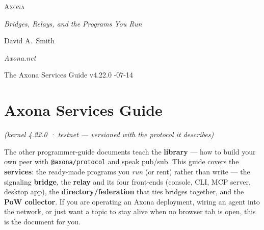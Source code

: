\documentclass[
  nobib]{tufte-handout}
\author{}
\date{}
\begin{document}
\thispagestyle{empty}
\null\vfill
\begin{center}
{\fontsize{48}{52}\selectfont \textsc{Axona}\par}
\vspace{0.6em}
{\Large\itshape Bridges, Relays, and the Programs You Run\par}
\vspace{4em}
{\large David A.~Smith\par}
{\itshape\small Axona.net\par}
\vspace{2em}
{\small The Axona Services Guide \quad v4.22.0 -07-14\par}
\end{center}
\vfill
\null
\newpage
\pagestyle{ndhtplain}
\thispagestyle{ndhtplain}
\setcounter{page}{1}

\section{Axona Services Guide}\label{axona-services-guide}

\emph{(kernel 4.22.0 · testnet --- versioned with the protocol it
describes)}

The other programmer-guide documents teach the \textbf{library} --- how
to build your own peer with \texttt{@axona/protocol} and speak pub/sub.
This guide covers the \textbf{services}: the ready-made programs you
\emph{run} (or rent) rather than write --- the signaling
\textbf{bridge}, the \textbf{relay} and its four front-ends (console,
CLI, MCP server, desktop app), the \textbf{directory/federation} that
ties bridges together, and the \textbf{PoW collector}. If you are
operating an Axona deployment, wiring an agent into the network, or just
want a topic to stay alive when no browser tab is open, this is the
document for you.
\end{document}
